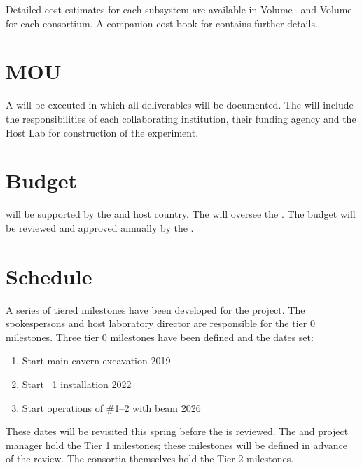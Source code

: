 Detailed cost estimates for each subsystem are available in
  Volume~\volnumbersp\:  and
Volume~\volnumberdp\:  for each consortium. A companion
cost book for  contains further details.

\section{MOU}
\label{sec:fdsp-coord-mou}

A  will be executed in which all deliverables will be
documented. The  will include the responsibilities of each
collaborating institution, their funding agency and the Host Lab for 
construction of the experiment.

\section{Budget}
\label{sec:fdsp-coord-budget}

  will be supported by the
 and host country. The  will oversee
the .  The  budget will be reviewed and
approved annually by the .

\section{Schedule}
\label{sec:fdsp-coord-controls}

A series of tiered milestones have been developed for the 
project. The spokespersons and host laboratory director are
responsible for the tier 0 milestones. Three tier 0 milestones have
been defined and the dates set:
\begin{enumerate}
\item Start main cavern excavation \hspace{2.58in} 2019
\item Start ~1 installation \hspace{2.1in} 2022
\item Start operations of  \#1--2 with beam \hspace{1in} 2026
\end{enumerate}
These dates will be revisited this spring before the  is reviewed. The
 and  project manager hold the Tier 1
milestones; these milestones will be defined in advance of the
 review. The consortia themselves hold the Tier 2
milestones.

